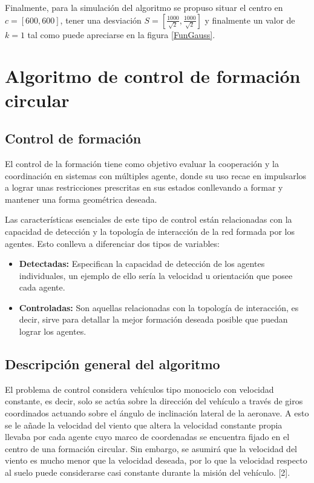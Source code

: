 Finalmente, para la simulación del algoritmo se propuso situar el centro en $c=\left[600,600\right]$, tener una desviación $S=\left[\frac{1000}{\sqrt{2}},\frac{1000}{\sqrt{2}}\right]$ y finalmente un valor de $k=1$ tal como puede apreciarse en la figura \ref{FunGauss}.

\section{Algoritmo de control de formación circular}

\subsection{Control de formación}

El control de la formación tiene como objetivo evaluar la cooperación y la coordinación en sistemas con múltiples agente, donde su uso recae en impulsarlos a lograr unas restricciones prescritas en sus estados conllevando a formar y mantener una forma geométrica deseada.

Las características esenciales de este tipo de control están relacionadas con la capacidad de detección y la topología de interacción de la red formada por los agentes. Esto conlleva a diferenciar dos tipos de variables:

\begin{itemize}
	\item \textbf{Detectadas:} Especifican la capacidad de detección de los agentes individuales, un ejemplo de ello sería la velocidad u orientación que posee cada agente.
	\item \textbf{Controladas:} Son aquellas relacionadas con la topología de interacción, es decir, sirve para detallar la mejor formación deseada posible que puedan lograr los agentes.
\end{itemize}

\subsection{Descripción general del algoritmo}

El problema de control considera vehículos tipo monociclo con velocidad constante, es decir, solo se actúa sobre la dirección del vehículo a través de giros coordinados actuando sobre el ángulo de inclinación lateral de la aeronave. A esto se le añade la velocidad del viento que altera la velocidad constante propia llevaba por cada agente cuyo marco de coordenadas se encuentra fijado en el centro de una formación circular. Sin embargo, se asumirá que la velocidad del viento es mucho menor que la velocidad deseada, por lo que la velocidad respecto al suelo puede considerarse casi constante durante la misión del vehículo. [2].


